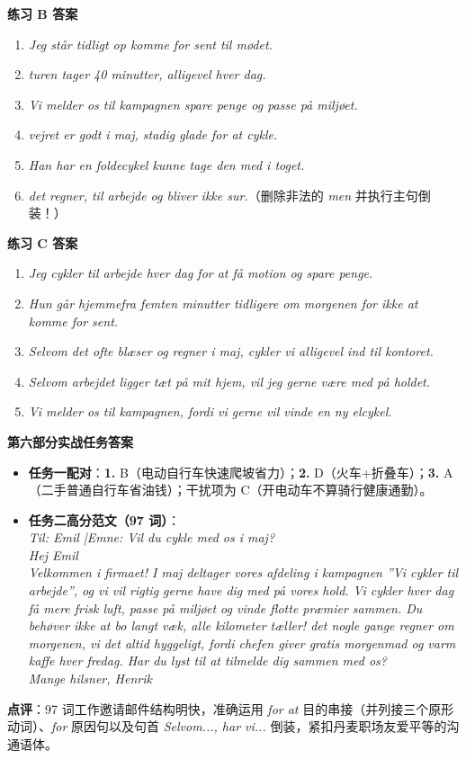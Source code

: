 \begin{answerbox}
\textbf{练习 B 答案}
\begin{enumerate}
  \item \textit{Jeg står tidligt op  komme for sent til mødet.}
  \item \textit{ turen tager 40 minutter,  alligevel hver dag.}
  \item \textit{Vi melder os til kampagnen  spare penge og passe på miljøet.}
  \item \textit{ vejret  er godt i maj,  stadig glade for at cykle.}
  \item \textit{Han har en foldecykel  kunne tage den med i toget.}
  \item \textit{ det regner,  til arbejde og bliver ikke sur.}（删除非法的 \textit{men} 并执行主句倒装！）
\end{enumerate}

\textbf{练习 C 答案}
\begin{enumerate}
  \item \textit{Jeg cykler til arbejde hver dag for at få motion og spare penge.}
  \item \textit{Hun går hjemmefra femten minutter tidligere om morgenen for ikke at komme for sent.}
  \item \textit{Selvom det ofte blæser og regner i maj, cykler vi alligevel ind til kontoret.}
  \item \textit{Selvom arbejdet ligger tæt på mit hjem, vil jeg gerne være med på holdet.}
  \item \textit{Vi melder os til kampagnen, fordi vi gerne vil vinde en ny elcykel.}
\end{enumerate}

\textbf{第六部分实战任务答案}
\begin{itemize}
  \item \textbf{任务一配对}：\textbf{1.} B（电动自行车快速爬坡省力）；\textbf{2.} D（火车+折叠车）；\textbf{3.} A（二手普通自行车省油钱）；干扰项为 C（开电动车不算骑行健康通勤）。
  \item \textbf{任务二高分范文（97 词）}：\\
    \textit{Til: Emil \quad|\quad Emne: Vil du cykle med os i maj?}\\
    \textit{Hej Emil}\\
    \textit{Velkommen i firmaet! I maj deltager vores afdeling i kampagnen ”Vi cykler til arbejde”, og vi vil rigtig gerne have dig med på vores hold. Vi cykler hver dag  få mere frisk luft, passe på miljøet og vinde flotte præmier sammen. Du behøver ikke at bo langt væk,  alle kilometer tæller!  det nogle gange regner om morgenen,  vi det altid hyggeligt, fordi chefen giver gratis morgenmad og varm kaffe hver fredag. Har du lyst til at tilmelde dig sammen med os?}\\
    \textit{Mange hilsner, Henrik}
\end{itemize}

\small\textbf{点评}：97 词工作邀请邮件结构明快，准确运用 \textit{for at} 目的串接（并列接三个原形动词）、\textit{for} 原因句以及句首 \textit{Selvom..., har vi...} 倒装，紧扣丹麦职场友爱平等的沟通语体。
\end{answerbox}
